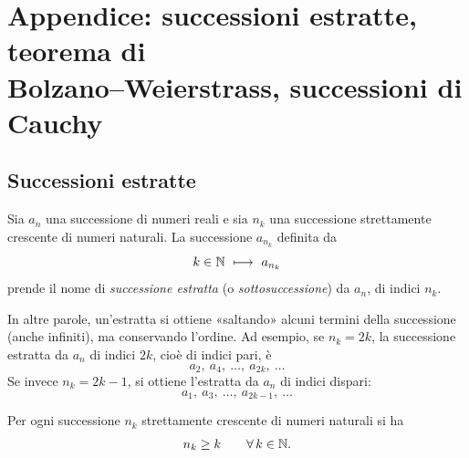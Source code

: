 \section[Appendice: successioni estratte, teorema di Bolzano--Weierstrass, successioni di Cauchy]%
  {Appendice: successioni estratte, teorema di\\ Bolzano--Weierstrass, successioni di Cauchy}
\label{sec:bw-cauchy}

\subsection{Successioni estratte}

\begin{definizione}
Sia $a_{n}$ una successione di numeri reali e sia $n_{k}$ una successione strettamente
crescente di numeri naturali. La successione $a_{n_{k}}$ definita da
\begin{equation}\label{eq:estratta}
  k\in\mathbb{N}\ \longmapsto\ a_{n_{k}}
\end{equation}
prende il nome di \emph{successione estratta} (o \emph{sottosuccessione}) da $a_{n}$, di
indici $n_{k}$.
\end{definizione}

In altre parole, un'estratta si ottiene «saltando» alcuni termini della successione (anche
infiniti), ma conservando l'ordine. Ad esempio, se $n_{k}=2k$, la successione estratta da
$a_{n}$ di indici $2k$, cioè di indici pari, è
\begin{equation}\label{eq:estratta-pari}
  a_{2},\ a_{4},\ \dots,\ a_{2k},\ \dots
\end{equation}
Se invece $n_{k}=2k-1$, si ottiene l'estratta da $a_{n}$ di indici dispari:
\begin{equation}\label{eq:estratta-dispari}
  a_{1},\ a_{3},\ \dots,\ a_{2k-1},\ \dots
\end{equation}

\begin{lemma}\label{lem:nk-maggiore-k}
Per ogni successione $n_{k}$ strettamente crescente di numeri naturali si ha
\begin{equation}\label{eq:nk-k}
  n_{k}\ge k \qquad\forall\, k\in\mathbb{N} .
\end{equation}
\end{lemma}


